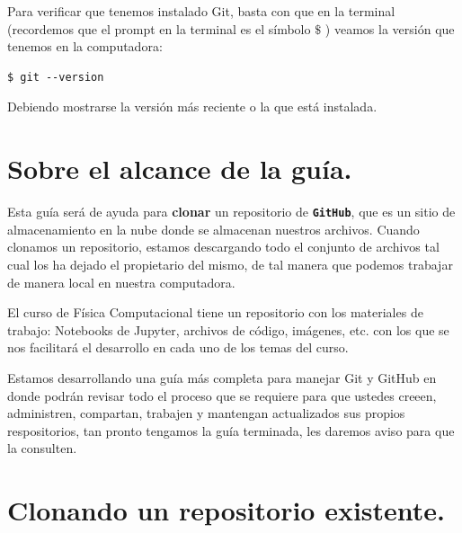 Para verificar que tenemos instalado Git, basta con que en la terminal (recordemos que el prompt en la terminal es el símbolo $\$$ ) veamos la versión que tenemos en la computadora:
\begin{verbatim}
$ git --version
\end{verbatim}
Debiendo mostrarse la versión más reciente o la que está instalada.

\section{Sobre el alcance de la guía.}

Esta guía será de ayuda para \textbf{clonar} un repositorio de \texttt{\textbf{GitHub}}, que es un sitio de almacenamiento en la nube donde se almacenan nuestros archivos. Cuando clonamos un repositorio, estamos descargando todo el conjunto de archivos tal cual los ha dejado el propietario del mismo, de tal manera que podemos trabajar de manera local en nuestra computadora.
\par
El curso de Física Computacional tiene un repositorio con los materiales de trabajo: Notebooks de Jupyter, archivos de código, imágenes, etc. con los que se nos facilitará el desarrollo en cada uno de los temas del curso.
\par
Estamos desarrollando una guía más completa para manejar Git y GitHub en donde podrán revisar todo el proceso que se requiere para que ustedes creeen, administren, compartan, trabajen y mantengan actualizados sus propios respositorios, tan pronto tengamos la guía terminada, les daremos aviso para que la consulten.

\section{Clonando un repositorio existente.}

